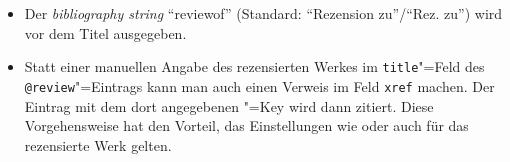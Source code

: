 \documentclass[ngerman]{scrartcl}
\begin{document}
\begin{itemize}
\begin{itemize}
          \item Der \emph{bibliography string} \enquote{reviewof} (Standard:
                \enquote{Rezension zu}\slash\enquote{Rez. zu}) wird vor dem
                Titel ausgegeben.
          \item Statt einer manuellen Angabe des rezensierten Werkes im \texttt{title}"=Feld
                des \texttt{@review}"=Eintrags kann man auch einen Verweis im Feld
                \texttt{xref} machen. Der Eintrag mit dem dort angegebenen \BibTeX"=Key
                wird dann zitiert. Diese Vorgehensweise hat den Vorteil, das Einstellungen
                wie  oder  auch für das rezensierte Werk 
                gelten.
        \end{itemize}
\end{itemize}
\end{document}
